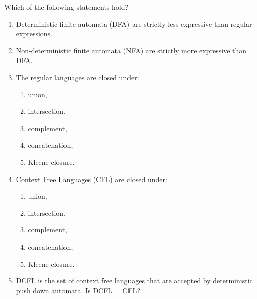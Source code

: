 \begin{exercise}{0}
  Which of the following statements hold?
  \begin{enumerate}
    \item Deterministic finite automata (DFA) are strictly less expressive than regular expressions.
    \item Non-deterministic finite automata (NFA) are strictly more expressive than DFA.
    \item The regular languages are closed under:
      \begin{enumerate}
    	 \item union,
    	 \item intersection,
    	 \item complement,
    	 \item concatenation,
    	 \item Kleene closure.
       \end{enumerate}
    \item Context Free Languages (CFL) are closed under:
      \begin{enumerate}
        \item union,
    	\item intersection,
    	\item complement,
    	\item concatenation,
    	\item Kleene closure.
      \end{enumerate}
    \item DCFL is the set of context free languages that are accepted by deterministic push down automata. Is DCFL = CFL?
  \end{enumerate}
\end{exercise}


